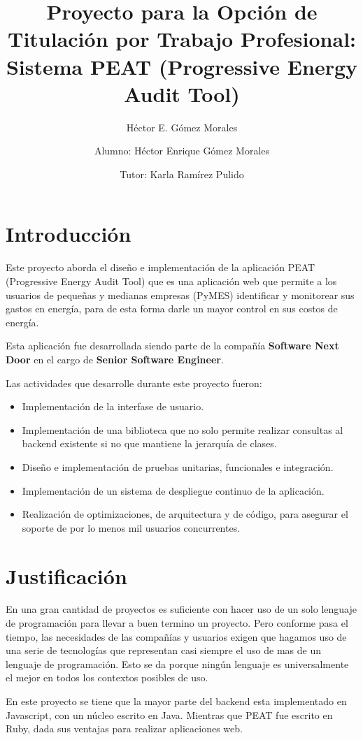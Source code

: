 \documentclass{article}
\author{Héctor E. Gómez Morales}
\title{Proyecto para la Opción de Titulación por Trabajo Profesional: \\
  Sistema PEAT (Progressive Energy Audit Tool)}
\begin{document}
\author{ Alumno: Héctor Enrique Gómez Morales \and
  Tutor: Karla Ramírez Pulido}
\maketitle
\section{Introducción}
Este proyecto aborda el diseño e implementación de la aplicación
PEAT (Progressive Energy Audit Tool) que es una aplicación web que
permite a los usuarios de pequeñas y medianas empresas (PyMES)
identificar y monitorear sus gastos en energía, para de esta forma
darle un mayor control en sus costos de energía.

Esta aplicación fue desarrollada siendo parte de la compañía
\textbf{Software Next Door} en el cargo de \textbf{Senior Software Engineer}.

Las actividades que desarrolle durante este proyecto fueron:
\begin{itemize}
\item Implementación de la interfase de usuario.
\item Implementación de una biblioteca que no solo permite realizar consultas
  al backend existente si no que mantiene la jerarquía de clases.
\item Diseño e implementación de pruebas unitarias, funcionales e integración.
\item Implementación de un sistema de despliegue continuo de la aplicación.
\item Realización de optimizaciones, de arquitectura y de código,
  para asegurar el soporte de por lo menos mil usuarios concurrentes.
\end{itemize}

\section{Justificación}
En una gran cantidad de proyectos es suficiente
con hacer uso de un solo lenguaje de programación para llevar a buen
termino un proyecto. Pero conforme pasa el tiempo, las necesidades
de las compañías y usuarios exigen que hagamos uso de una serie de
tecnologías que representan casi siempre el uso de mas de un lenguaje
de programación. Esto se da porque ningún lenguaje es universalmente
el mejor en todos los contextos posibles de uso.

En este proyecto se tiene que la mayor parte del backend esta implementado
en Javascript, con un núcleo escrito en Java. Mientras que PEAT fue escrito
en Ruby, dada sus ventajas para realizar aplicaciones web.
\end{document}
